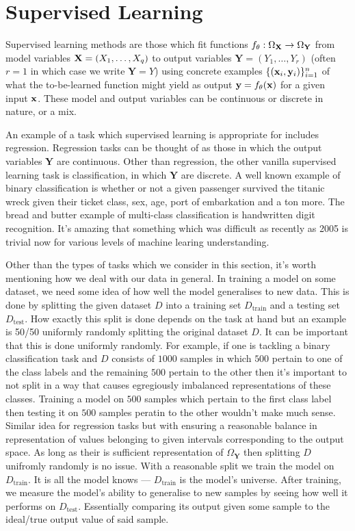 \documentclass[11pt]{article}
\begin{document}
\section{Supervised Learning}
Supervised learning methods are those which fit functions $f_{\theta}:\Omega_{\mathbf{X}}\to\Omega_{\mathbf{Y}}$ from model variables $\mathbf{X}=(X_1,\dots,X_q)$ to output variables $\mathbf{Y}=(Y_1,\dots,Y_r)$ (often $r=1$ in which case we write $\mathbf{Y}=Y$) using concrete examples $\{(\mathbf{x}_i,\mathbf{y}_i)\}_{i=1}^n$ of what the to-be-learned function might yield as output $\mathbf{y}=f_{\theta}(\mathbf{x})$ for a given input $\mathbf{x}$. These model and output variables can be continuous or discrete in nature, or a mix.

An example of a task which supervised learning is appropriate for includes regression. Regression tasks can be thought of as those in which the output variables $\mathbf{Y}$ are continuous. Other than regression, the other vanilla supervised learning task is classification, in which $\mathbf{Y}$ are discrete. A well known example of binary classification is whether or not a given passenger survived the titanic wreck given their ticket class, sex, age, port of embarkation and a ton more. The bread and butter example of multi-class classification is handwritten digit recognition. It's amazing that something which was difficult as recently as 2005 is trivial now for various levels of machine learing understanding.

Other than the types of tasks which we consider in this section, it's worth mentioning how we deal with our data in general. In training a model on some dataset, we need some idea of how well the model generalises to new data. This is done by splitting the given dataset $D$ into a training set $D_{\text{train}}$ and a testing set $D_{\text{test}}$. How exactly this split is done depends on the task at hand but an example is 50/50 uniformly randomly splitting the original dataset $D$. It can be important that this is done uniformly randomly. For example, if one is tackling a binary classification task and $D$ consists of $1000$ samples in which $500$ pertain to one of the class labels and the remaining $500$ pertain to the other then it's important to not split in a way that causes egregiously imbalanced representations of these classes. Training a model on $500$ samples which pertain to the first class label then testing it on $500$ samples peratin to the other wouldn't make much sense. Similar idea for regression tasks but with ensuring a reasonable balance in representation of values belonging to given intervals corresponding to the output space. As long as their is sufficient representation of $\Omega_{\mathbf{Y}}$ then splitting $D$ unifromly randomly is no issue. With a reasonable split we train the model on $D_{\text{train}}$. It is all the model knows — $D_{\text{train}}$ is the model's universe. After training, we measure the model's ability to generalise to new samples by seeing how well it performs on $D_{\text{test}}$. Essentially comparing its output given some sample to the ideal/true output value of said sample.
\end{document}
